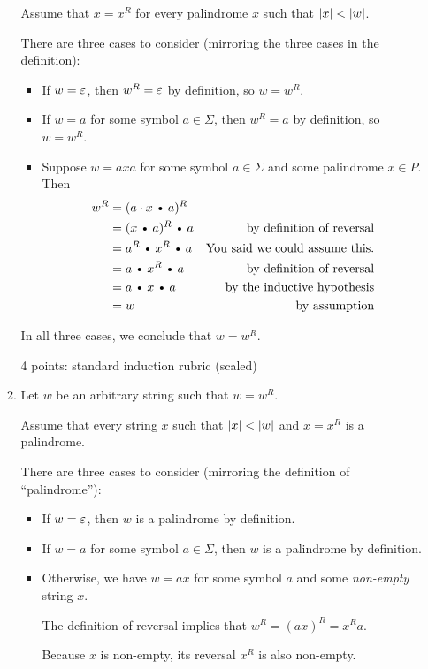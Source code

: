 \documentclass[11pt]{article}
\def\Cdot{\mathbin{\text{\normalfont \textbullet}}}
\begin{document}
\begin{enumerate}
\begin{solution}
\begin{enumerate}
Assume that $x = x^R$ for every palindrome $x$ such that $\mathopen| x \mathclose|<\mathopen| w \mathclose|$.

There are three cases to consider (mirroring the three cases in the definition):
\begin{itemize}
\item
If $w = \varepsilon$, then $w^R = \varepsilon$ by definition, so $w = w^R$.

\item
If $w = a$ for some symbol $a\in\Sigma$, then $w^R = a$ by definition, so $w = w^R$.

\item
Suppose $w = axa$ for some symbol $a\in\Sigma$ and some palindrome $x\in P$.  Then 
\begin{align*}
	w^R
	&=	(a \cdot x \Cdot a)^R		\\
	&=	(x\Cdot a)^R \Cdot a		& \text{by definition of reversal} \\
	&=	a^R \Cdot x^R \Cdot a		& \text{You said we could assume this.}\\
	&=	a \Cdot x^R \Cdot a			& \text{by definition of reversal} \\
	&=	a \Cdot x \Cdot a			& \text{by the inductive hypothesis} \\
	&=	w							& \text{by assumption}
\end{align*}
\end{itemize}
In all three cases, we conclude that $w = w^R$.

\begin{rubric}
4 points: standard induction rubric (scaled)
\end{rubric}

\medskip
\item
Let $w$ be an arbitrary string such that $w = w^R$.

Assume that every string $x$ such that $\mathopen| x \mathclose| < \mathopen| w \mathclose|$ and $x = x^R$ is a palindrome.

There are three cases to consider (mirroring the definition of “palindrome”):
\begin{itemize}
\item 
If $w = \varepsilon$, then $w$ is a palindrome by definition.
\item 
If $w = a$ for some symbol $a\in\Sigma$, then $w$ is a palindrome by definition.
\item
Otherwise, we have $w = ax$ for some symbol $a$ and some \emph{non-empty} string $x$.
  
The definition of reversal implies that $w^R = (ax)^R = x^R a$.

Because $x$ is non-empty, its reversal $x^R$ is also non-empty.


\end{itemize}
\end{enumerate}
\end{solution}
\end{enumerate}
\end{document}

